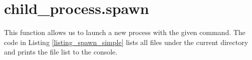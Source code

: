 \section{child\_process.spawn}
This function allows us to launch a new process with the given command. The code in Listing \ref{listing_spawn_simple} lists all files under the current directory and prints the file list to the console. 

